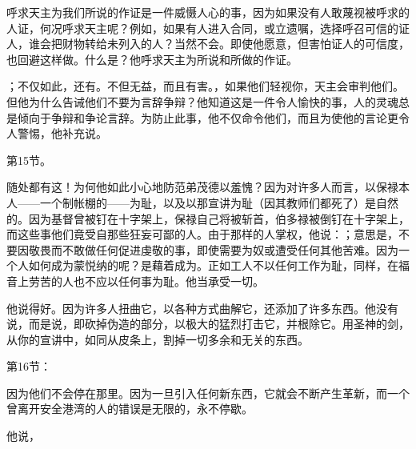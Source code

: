  呼求天主为我们所说的作证是一件威慑人心的事，因为如果没有人敢蔑视被呼求的人证，何况呼求天主呢？例如，如果有人进入合同，或立遗嘱，选择呼召可信的证人，谁会把财物转给未列入的人？当然不会。即使他愿意，但害怕证人的可信度，也回避这样做。什么是？他呼求天主为所说和所做的作证。\par

；不仅如此，还有。不但无益，而且有害。，如果他们轻视你，天主会审判他们。但他为什么告诫他们不要为言辞争辩？他知道这是一件令人愉快的事，人的灵魂总是倾向于争辩和争论言辞。为防止此事，他不仅命令他们，而且为使他的言论更令人警惕，他补充说。\par

第15节。 \par

随处都有这！为何他如此小心地防范弟茂德以羞愧？因为对许多人而言，以保禄本人——一个制帐棚的——为耻，以及以那宣讲为耻（因其教师们都死了）是自然的。因为基督曾被钉在十字架上，保禄自己将被斩首，伯多禄被倒钉在十字架上，而这些事他们竟受自那些狂妄可鄙的人。由于那样的人掌权，他说：；意思是，不要因敬畏而不敢做任何促进虔敬的事，即使需要为奴或遭受任何其他苦难。因为一个人如何成为蒙悦纳的呢？是藉着成为。正如工人不以任何工作为耻，同样，在福音上劳苦的人也不应以任何事为耻。他当承受一切。\par

\par

他说得好。因为许多人扭曲它，以各种方式曲解它，还添加了许多东西。他没有说，而是说，即砍掉伪造的部分，以极大的猛烈打击它，并根除它。用圣神的剑，从你的宣讲中，如同从皮条上，割掉一切多余和无关的东西。\par

第16节： \par

因为他们不会停在那里。因为一旦引入任何新东西，它就会不断产生革新，而一个曾离开安全港湾的人的错误是无限的，永不停歇。\par

他说，\par

